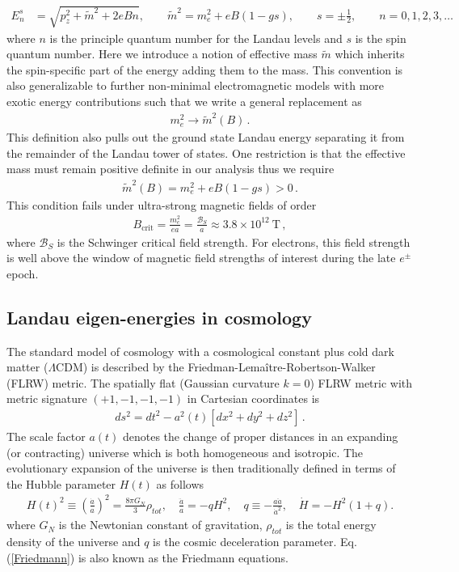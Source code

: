 \documentclass[Universe,article,submit,moreauthors,pdftex]{Definitions/mdpi}
\newcommand{\req}[1]{Eq.\,(\ref{#1})}
\begin{document}
\begin{align}
  \label{KGPEnergy} E_{n}^{s}&=\sqrt{p^2_z+\tilde{m}^2+2eBn},\qquad\tilde{m}^2=m^2_e+eB\left(1-gs\right),\qquad s=\pm\frac{1}{2},\qquad n=0,1,2,3,\dots
\end{align}
where $n$ is the principle quantum number for the Landau levels and $s$ is the spin quantum number. Here we introduce a notion of effective mass $\tilde{m}$ which inherits the spin-specific part of the energy adding them to the mass. This convention is also generalizable to further non-minimal electromagnetic models with more exotic energy contributions such that we write a general replacement as
\begin{align}
  \label{MagMass} m_{e}^{2}\rightarrow\tilde{m}^2(B)\,.
\end{align}
This definition also pulls out the ground state Landau energy separating it from the remainder of the Landau tower of states. One restriction is that the effective mass must remain positive definite in our analysis thus we require
\begin{align}
  \label{MassLimit} \tilde{m}^2(B)=m^2_e+eB\left(1-gs\right)>0\,.
\end{align}
This condition fails under ultra-strong magnetic fields of order
\begin{align}
  \label{MagMassFail} B_{\mathrm{crit}}=\frac{m_{e}^{2}}{ea}=\frac{\mathcal{B}_{S}}{a}\approx3.8\times10^{12}\ \mathrm{T}\,,
\end{align}
where $\mathcal{B}_{S}$ is the Schwinger critical field strength. For electrons, this field strength is well above the window of magnetic field strengths of interest during the late $e^{\pm}$ epoch.

\subsection{Landau eigen-energies in cosmology}\label{subsec:Landau}
\noindent The standard model of cosmology with a cosmological constant plus cold dark matter ($\Lambda\mathrm{CDM}$) is described by the Friedman-Lemaître-Robertson-Walker (FLRW) metric. The spatially flat (Gaussian curvature $k=0$) FLRW metric with metric signature $(+1,-1,-1,-1)$ in Cartesian coordinates is
\begin{align}
    \label{FLRW} ds^2=dt^2-a^2(t)\left[dx^2+dy^2+dz^2\right]\,.
\end{align}
The scale factor $a(t)$ denotes the change of proper distances in an expanding (or contracting) universe which is both homogeneous and isotropic. The evolutionary expansion of the universe is then traditionally defined in terms of the Hubble parameter $H(t)$ as follows
\begin{align}
  \label{Friedmann} H(t)^{2}\equiv\left(\frac{\dot a}{a}\right)^2=\frac{8\pi G_{N}}{3}\rho_{tot},\quad \frac{\ddot a}{a}=-qH^2,\quad 
q\equiv -\frac{a\ddot a}{\dot a^2},\quad \dot H=-H^2(1+q).
\end{align}
where $G_N$ is the Newtonian constant of gravitation, $\rho_{tot}$ is the total energy density of the universe and $q$ is the cosmic deceleration parameter. \req{Friedmann} is also known as the Friedmann equations. 
\end{document}
